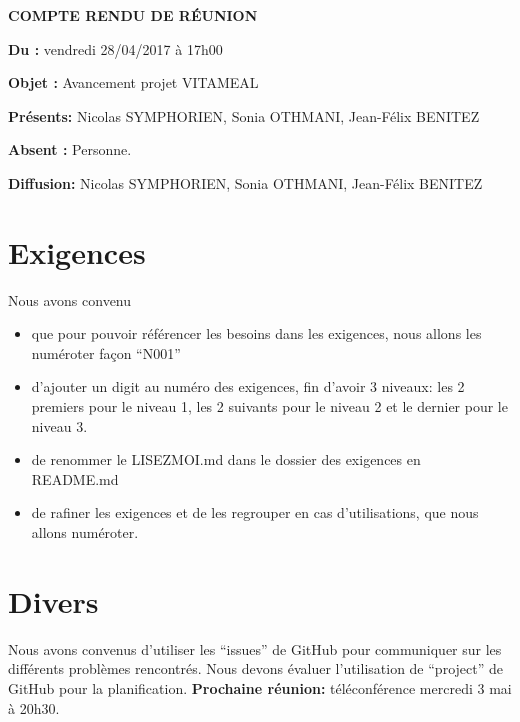 \documentclass[11pt,a4paper,french,twoside,openright]{article}
\begin{document}
\pagestyle{fancy}

\begin{center}\bfseries\Huge
COMPTE RENDU DE RÉUNION
\end{center}

\textbf{Du      :} vendredi 28/04/2017 à 17h00

\textbf{Objet   :} Avancement projet VITAMEAL

\textbf{Présents:} Nicolas SYMPHORIEN, Sonia OTHMANI, Jean-Félix BENITEZ

\textbf{Absent :} Personne.

\textbf{Diffusion:} Nicolas SYMPHORIEN, Sonia OTHMANI, Jean-Félix BENITEZ

\hrulefill

\section{Exigences}
Nous avons convenu
\begin{itemize}
\item que pour pouvoir référencer les besoins dans les exigences, nous allons les numéroter façon \enquote{N001}
\item d'ajouter un digit au numéro des exigences, fin d'avoir 3 niveaux: les 2 premiers pour le niveau 1, les 2 suivants pour le niveau 2 et le dernier pour le niveau 3.
\item de renommer le LISEZMOI.md dans le dossier des exigences en README.md
\item de rafiner les exigences et de les regrouper en cas d'utilisations, que nous allons numéroter.
\end{itemize}

\section{Divers}
Nous avons convenus d'utiliser les \enquote{issues} de GitHub pour communiquer sur les différents problèmes rencontrés.
Nous devons évaluer l'utilisation de \enquote{project} de GitHub pour la planification.
\textbf{Prochaine réunion:} téléconférence mercredi 3 mai à 20h30.

\label{LastPage}
\end{document}
